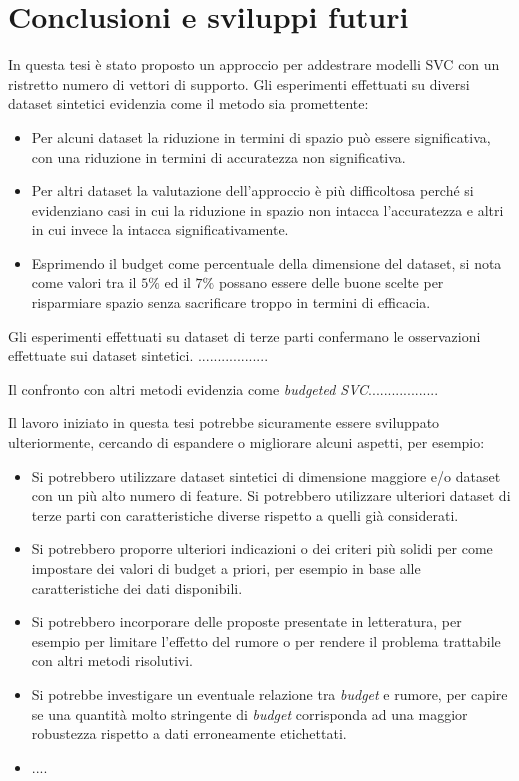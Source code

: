 \chapter{Conclusioni e sviluppi futuri}
\label{chap:conclusioni}
In questa tesi è stato proposto un approccio per addestrare modelli SVC con un ristretto numero di vettori di supporto.
Gli esperimenti effettuati su diversi dataset sintetici evidenzia come il metodo sia promettente:
\begin{itemize}
    \item Per alcuni dataset la riduzione in termini di spazio può essere significativa, con una riduzione in termini di accuratezza non significativa.
    \item Per altri dataset la valutazione dell'approccio è più difficoltosa perché si evidenziano casi in cui la riduzione in spazio non intacca l'accuratezza e altri in cui invece la intacca significativamente.
    \item Esprimendo il budget come percentuale della dimensione del dataset, si nota come valori tra il $5\%$ ed il $7\%$ possano essere delle buone scelte per risparmiare spazio senza sacrificare troppo in termini di efficacia.
\end{itemize}

Gli esperimenti effettuati su dataset di terze parti confermano le osservazioni effettuate sui dataset sintetici. ..................


Il confronto con altri metodi evidenzia come \emph{budgeted SVC}..................


Il lavoro iniziato in questa tesi potrebbe sicuramente essere sviluppato ulteriormente, cercando di espandere o migliorare alcuni aspetti, per esempio:
\begin{itemize}
    \item Si potrebbero utilizzare dataset sintetici di dimensione maggiore e/o dataset con un più alto numero di feature. Si potrebbero utilizzare ulteriori dataset di terze parti con caratteristiche diverse rispetto a quelli già considerati.
    \item Si potrebbero proporre ulteriori indicazioni o dei criteri più solidi per come impostare dei valori di budget a priori, per esempio in base alle caratteristiche dei dati disponibili.
    \item Si potrebbero incorporare delle proposte presentate in letteratura, per esempio per limitare l'effetto del rumore o per rendere il problema trattabile con altri metodi risolutivi.
    \item Si potrebbe investigare un eventuale relazione tra \emph{budget} e rumore, per capire se una quantità molto stringente di \emph{budget} corrisponda ad una maggior robustezza rispetto a dati erroneamente etichettati.
    \item ....
\end{itemize}

